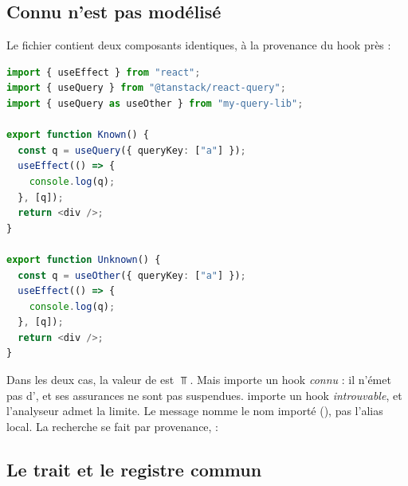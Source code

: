\subsection{Connu n'est pas modélisé}

Le fichier  contient deux composants identiques, à la provenance du hook près :

\begin{lstlisting}[language=TypeScript,caption={Deux \code{useQuery}, deux provenances (\file{/tmp/ch23/sum/Nav.tsx})},label={lst:sum-nav}]
import { useEffect } from "react";
import { useQuery } from "@tanstack/react-query";
import { useQuery as useOther } from "my-query-lib";

export function Known() {
  const q = useQuery({ queryKey: ["a"] });
  useEffect(() => {
    console.log(q);
  }, [q]);
  return <div />;
}

export function Unknown() {
  const q = useOther({ queryKey: ["a"] });
  useEffect(() => {
    console.log(q);
  }, [q]);
  return <div />;
}
\end{lstlisting}


Dans les deux cas, la valeur de  est $\Top$. Mais  importe un hook \emph{connu} : il n'émet pas d'\Info{}, et ses assurances ne sont pas suspendues.  importe un hook \emph{introuvable}, et l'analyseur admet la limite. Le message nomme le nom importé (), pas l'alias local. La recherche se fait par provenance,  :



\subsection{Le trait et le registre commun}


